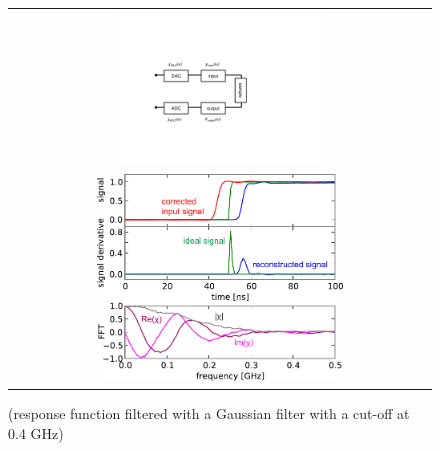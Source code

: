 \begin{figure}[ht!]
	\begin{center} 
	\begin{tabular}{c}
	 \includegraphics[width=0.5\textwidth]{"./material/figures/measurement/fluxline_model"} \\
	 \includegraphics[width=0.6\textwidth]{"./data/ct5/2011_04_04 - flux tomography/flux tomography"}
	 \end{tabular}
	\end{center}
	 \caption[]{(response function filtered with a Gaussian filter with a cut-off at 0.4 GHz)}
	 \label{fig:FluxLineResponseFunction}
\end{figure}

